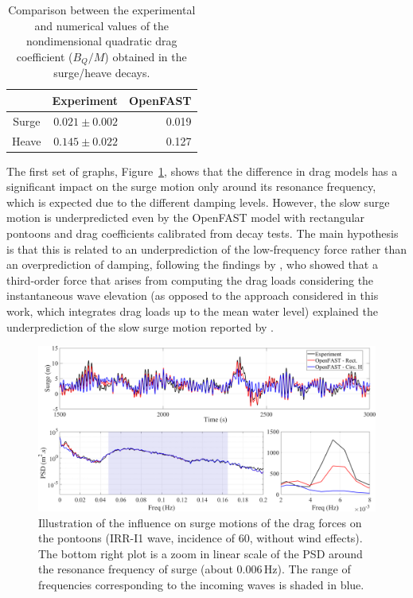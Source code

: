 \begin{table}[!hbtp]
	\caption{Comparison between the experimental and numerical values of the nondimensional quadratic drag coefficient ($B_Q/M$) obtained in the surge/heave decays.}\label{tab:exp_vs_num:drag:quad_damp_decay}
	\begin{tabular}{crr}
		\toprule
		& Experiment & OpenFAST \\
		\midrule
		Surge & $0.021\pm0.002$ & 0.019 \\
		Heave & $0.145\pm0.022$ & 0.127 \\
		\bottomrule
	\end{tabular}
\end{table}

The first set of graphs, Figure~\ref{fig:exp_vs_num:drag:ptfmsurge}, shows that the difference in drag models has a significant impact on the surge motion only around its resonance frequency, which is expected due to the different damping levels. However, the slow surge motion is underpredicted even by the OpenFAST model with rectangular pontoons and drag coefficients calibrated from decay tests. The main hypothesis is that this is related to an underprediction of the low-frequency force rather than an overprediction of damping, following the findings by \citet{wang2022oc6}, who showed that a third-order force that arises from computing the drag loads considering the instantaneous wave elevation (as opposed to the approach considered in this work, which integrates drag loads up to the mean water level) explained the underprediction of the slow surge motion reported by \cite{OC52017}. 

\begin{figure}[!hbtp]
	\centering
	\includegraphics[width=\textwidth]{./figures/ptfmsurge-drag_pontoon.png}	
	\caption{Illustration of the influence on surge motions of the drag forces on the pontoons (IRR-I1 wave, incidence of 60\textdegree{}, without wind effects). The bottom right plot is a zoom in linear scale of the PSD around the resonance frequency of surge (about $0.006\,\text{Hz}$). The range of frequencies corresponding to the incoming waves is shaded in blue.} \label{fig:exp_vs_num:drag:ptfmsurge}
\end{figure}

